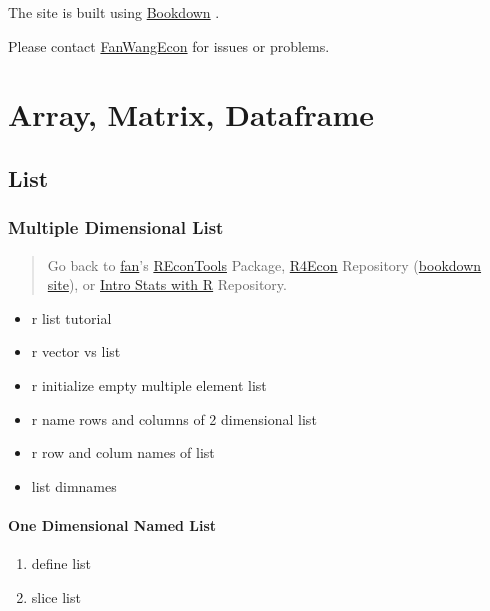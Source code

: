 \documentclass[
]{book}
\providecommand{\tightlist}{%
  \setlength{\itemsep}{0pt}\setlength{\parskip}{0pt}}
\begin{document}
The site is built using \href{https://bookdown.org/}{Bookdown} \citep{R-bookdown}.

Please contact \href{https://fanwangecon.github.io/}{FanWangEcon} for issues or problems.

\hypertarget{array-matrix-dataframe}{%
\chapter{Array, Matrix, Dataframe}\label{array-matrix-dataframe}}

\hypertarget{list}{%
\section{List}\label{list}}

\hypertarget{multiple-dimensional-list}{%
\subsection{Multiple Dimensional List}\label{multiple-dimensional-list}}

\begin{quote}
Go back to \href{http://fanwangecon.github.io/CodeDynaAsset/}{fan}'s \href{https://fanwangecon.github.io/REconTools/}{REconTools} Package, \href{https://fanwangecon.github.io/R4Econ/}{R4Econ} Repository (\href{https://fanwangecon.github.io/R4Econ/bookdown}{bookdown site}), or \href{https://fanwangecon.github.io/Stat4Econ/}{Intro Stats with R} Repository.
\end{quote}

\begin{itemize}
\tightlist
\item
  r list tutorial
\item
  r vector vs list
\item
  r initialize empty multiple element list
\item
  r name rows and columns of 2 dimensional list
\item
  r row and colum names of list
\item
  list dimnames
\end{itemize}

\hypertarget{one-dimensional-named-list}{%
\subsubsection{One Dimensional Named List}\label{one-dimensional-named-list}}

\begin{enumerate}
\def\labelenumi{\arabic{enumi}.}
\tightlist
\item
  define list
\item
  slice list
\end{enumerate}
\end{document}
